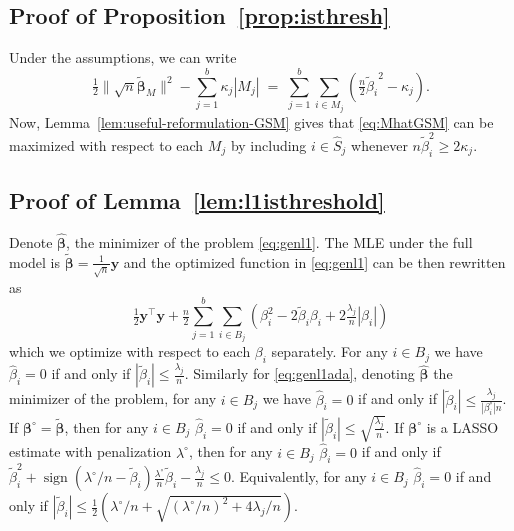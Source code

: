 \documentclass[aos]{imsart}
\theoremstyle{plain}
\newcommand{\bs}{\boldsymbol}
\begin{document}
\subsection{Proof of Proposition~\ref{prop:isthresh}}
	Under the assumptions, we can write 
	$$
	\tfrac{1}{2}\|\sqrt{n}\tilde{\bs \beta}_M\|^2-\sum_{j=1}^b\kappa_j |M_j|\;=\;\sum_{j=1}^b\sum_{i\in M_j}(\tfrac{n}{2}{\tilde{ \beta}_i}^2-\kappa_j).
	$$
	Now, Lemma~\ref{lem:useful-reformulation-GSM} gives that \eqref{eq:MhatGSM} can be maximized with respect to each $M_j$ by including $i\in \hat S_j$ whenever $n\tilde\beta_i^2\geq 2\kappa_j$.

\subsection{Proof of Lemma~\ref{lem:l1isthreshold}}
    Denote $\hat{\bs \beta}$, the minimizer of the problem \eqref{eq:genl1}. The MLE under the full model is $\tilde{\bs\beta}=\tfrac{1}{\sqrt{n}} \bs y$ and the optimized function in \eqref{eq:genl1} can be then rewritten as
	$$
	\tfrac{1}{2}\bs y^{\top}\bs y +\tfrac{n}{2}\sum_{j=1}^b\sum_{i\in B_j}\left(\beta_i^2-2\tilde\beta_i\beta_i+2\tfrac{\lambda_j}{n}|\beta_i|\right)
	$$
	which we optimize with respect to each $\beta_i$ separately. For any $i\in B_j$ we have $\hat\beta_i=0$ if and only if $|\tilde \beta_i|\leq \frac{\lambda_j}{n}$. Similarly  for \eqref{eq:genl1ada}, denoting $\hat{\bs \beta}$ the minimizer of the problem, for any $i\in B_j$ we have $\hat\beta_i=0$ if and only if $|\tilde \beta_i|\leq \frac{\lambda_j}{|\beta^{\circ}_i|n}$. If $\bs \beta^{\circ}= \tilde{\bs\beta}$, then for any $i\in B_j$ $\hat{\beta}_i = 0$ if and only if $|\tilde \beta_i|\leq \sqrt{\tfrac{\lambda_j}{n}}$. If $\bs\beta^\circ$ is a LASSO estimate with penalization $\lambda^\circ$, then for any $i\in B_j$ 
 $\hat{\beta}_i = 0$ if and only if $\tilde{\beta}^2_i + \operatorname{sign}(\lambda^{\circ}/n-\tilde{\beta}_i) \frac{\lambda^\circ}{n}\tilde{\beta}_i-\frac{\lambda_j}{n} \leq 0$. Equivalently, for any $i\in B_j$ 
 $\hat{\beta}_i = 0$ if and only if $|\tilde{\beta}_ i| \leq  \frac{1}{2}\left(\lambda^\circ/n+\sqrt{(\lambda^\circ/n)^2+4 \lambda_j/n}\right)$.
\end{document}
